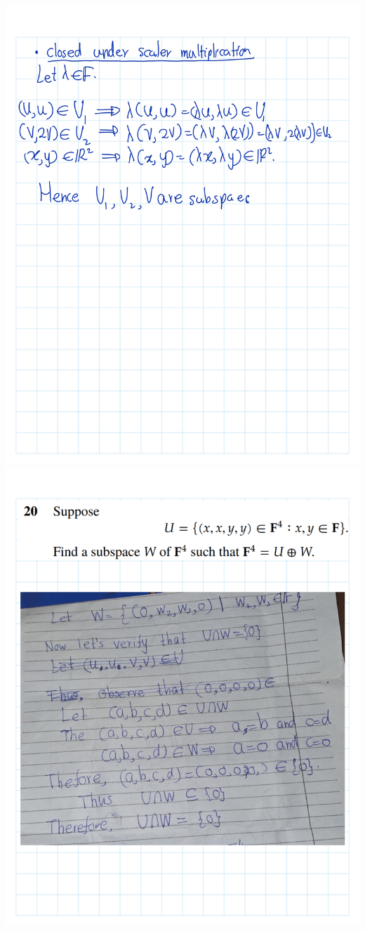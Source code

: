 \documentclass[
]{book}
\theoremstyle{definition}
\theoremstyle{definition}
\theoremstyle{definition}
\theoremstyle{definition}
\theoremstyle{remark}
\begin{document}
\begin{enumerate}
  \includegraphics{fig/Ex1C/Ex/Ex-22.png} \includegraphics{fig/Ex1C/Ex/Ex-23.png}

\end{enumerate}
\end{document}
